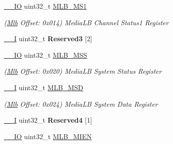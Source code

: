 \begin{DoxyCompactItemize}
\item 
\mbox{\label{structMlb_a70cd091534c887c3b30a03570d8b923d}} 
\mbox{\hyperlink{core__cm7_8h_aec43007d9998a0a0e01faede4133d6be}{\+\_\+\+\_\+\+IO}} uint32\+\_\+t \mbox{\hyperlink{structMlb_a70cd091534c887c3b30a03570d8b923d}{M\+L\+B\+\_\+\+M\+S1}}
\begin{DoxyCompactList}\small\item\em (\mbox{\hyperlink{structMlb}{Mlb}} Offset\+: 0x014) Media\+LB Channel Status1 Register \end{DoxyCompactList}\item 
\mbox{\label{structMlb_a0f8312d6ffee811df7c771a24bc614e4}} 
\mbox{\hyperlink{core__cm7_8h_af63697ed9952cc71e1225efe205f6cd3}{\+\_\+\+\_\+I}} uint32\+\_\+t {\bfseries Reserved3} \mbox{[}2\mbox{]}
\item 
\mbox{\label{structMlb_a8be01516d6ed2b2851b592dbc28cdd94}} 
\mbox{\hyperlink{core__cm7_8h_aec43007d9998a0a0e01faede4133d6be}{\+\_\+\+\_\+\+IO}} uint32\+\_\+t \mbox{\hyperlink{structMlb_a8be01516d6ed2b2851b592dbc28cdd94}{M\+L\+B\+\_\+\+M\+SS}}
\begin{DoxyCompactList}\small\item\em (\mbox{\hyperlink{structMlb}{Mlb}} Offset\+: 0x020) Media\+LB System Status Register \end{DoxyCompactList}\item 
\mbox{\label{structMlb_a6df1299be3bfc1e2e1fcc00d942ce661}} 
\mbox{\hyperlink{core__cm7_8h_af63697ed9952cc71e1225efe205f6cd3}{\+\_\+\+\_\+I}} uint32\+\_\+t \mbox{\hyperlink{structMlb_a6df1299be3bfc1e2e1fcc00d942ce661}{M\+L\+B\+\_\+\+M\+SD}}
\begin{DoxyCompactList}\small\item\em (\mbox{\hyperlink{structMlb}{Mlb}} Offset\+: 0x024) Media\+LB System Data Register \end{DoxyCompactList}\item 
\mbox{\label{structMlb_a17eebfb9b0e4e9adebfc93813b9c56db}} 
\mbox{\hyperlink{core__cm7_8h_af63697ed9952cc71e1225efe205f6cd3}{\+\_\+\+\_\+I}} uint32\+\_\+t {\bfseries Reserved4} \mbox{[}1\mbox{]}
\item 
\mbox{\label{structMlb_a07bda8b44611a12b7b90f544880590c0}} 
\mbox{\hyperlink{core__cm7_8h_aec43007d9998a0a0e01faede4133d6be}{\+\_\+\+\_\+\+IO}} uint32\+\_\+t \mbox{\hyperlink{structMlb_a07bda8b44611a12b7b90f544880590c0}{M\+L\+B\+\_\+\+M\+I\+EN}}

\end{DoxyCompactItemize}
